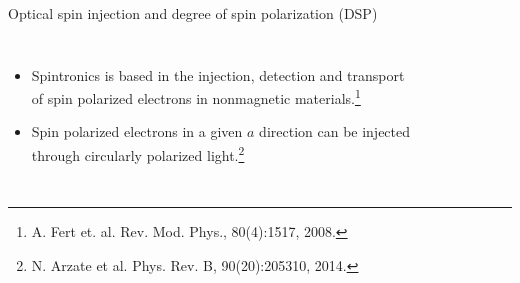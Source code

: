 \documentclass{beamer}
\begin{document}
\begin{frame}

\vspace{-0.2cm}

\noindent\makebox[\linewidth]{\rule{\linewidth}{0.4pt}}

\vspace{-2.0mm}
\begin{center}
{\large Optical spin injection and degree of spin polarization (DSP)}
\end{center}

\vspace{-6mm}
\noindent\makebox[\linewidth]{\rule{\linewidth}{0.4pt}}


{\small

\begin{columns}
    
\begin{itemize}

\item 
Spintronics is based in the injection, detection and transport of spin
polarized electrons in nonmagnetic materials.\footnote[frame]{\tiny A. Fert et.
al. Rev. Mod. Phys., 80(4):1517, 2008.}

\item 
Spin polarized electrons in a given $a$ direction can be injected through
circularly polarized light.\footnote[frame]{\tiny N. Arzate et al. Phys. Rev.
B, 90(20):205310, 2014.}

\end{itemize}



\begin{figure}[h!]
\begin{tikzpicture}


\end{tikzpicture}
\end{figure}
\end{columns}}
\end{frame}
\end{document}
